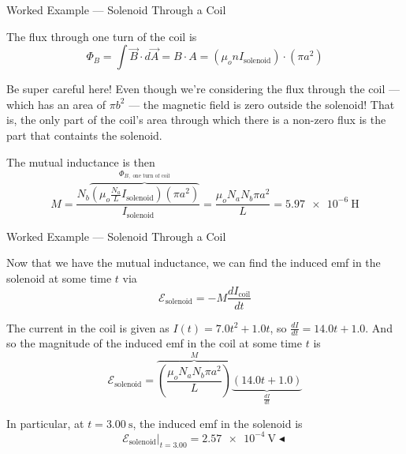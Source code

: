 \documentclass{beamer}
\begin{document}
\begin{frame}{Worked Example --- Solenoid Through a Coil}

The flux through one turn of the coil is
\begin{equation*}
    \Phi_{B} = \int \vec{B} \cdot d\vec{A} = B \cdot A = \left( \mu_o n I_{\text{solenoid}} \right) \cdot \left( \pi a^2 \right)
\end{equation*}

Be super careful here! Even though we're considering the flux through the coil --- which has an area of $\pi b^2$ --- the magnetic field is zero outside the solenoid! That is, the only part of the coil's area through which there is a non-zero flux is the part that containts the solenoid.

\vfill

The mutual inductance is then
\begin{equation*}
    M = \frac{N_b \overbrace{\left( \mu_o \frac{N_a}{L} I_{\text{solenoid}} \right) \left( \pi a^2 \right)}^{\Phi_{B, \text{ one turn of coil}}}}{I_{\text{solenoid}}} = \frac{\mu_o N_a N_b \pi a^2}{L} = \SI{5.97e-6}{\henry}
\end{equation*}

\end{frame}

\begin{frame}{Worked Example --- Solenoid Through a Coil}

Now that we have the mutual inductance, we can find the induced emf in the solenoid at some time $t$ via
\begin{equation*}
    \mathcal{E}_{\text{solenoid}} = -M \frac{dI_{\text{coil}}}{dt}
\end{equation*}

The current in the coil is given as $I(t) = 7.0 t^2 + 1.0 t$, so $\frac{dI}{dt} = 14.0 t + 1.0$. And so the magnitude of the induced emf in the coil at some time $t$ is
\begin{equation*}
    \mathcal{E}_{\text{solenoid}} = \overbrace{\left( \frac{\mu_o N_a N_b \pi a^2}{L} \right)}^{M} \underbrace{\left( 14.0 t + 1.0 \right)}_{\frac{dI}{dt}}
\end{equation*}

In particular, at $t= \SI{3.00}{\second}$, the induced emf in the solenoid is
\begin{equation*}
    \boxed{\mathcal{E}_{\text{solenoid}} \bigg|_{t=3.00} = \SI{2.57e-4}{\volt}} \blacktriangleleft
\end{equation*}

\end{frame}
\end{document}

